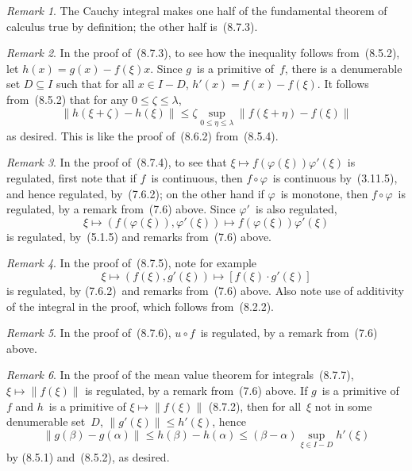 \documentclass[letterpaper,12pt]{article}
\newcommand{\after}{\circ}
\newcommand{\norm}[1]{\lVert{#1}\rVert}
\newcommand{\cbprod}[2]{[{#1}\cdot{#2}]}
\theoremstyle{plain}
\theoremstyle{definition}
\theoremstyle{remark}
\newtheorem*{rmk}{Remark}
\begin{document}
\begin{rmk}
The Cauchy integral makes one half of the fundamental theorem of calculus true by definition; the other half is~(8.7.3).
\end{rmk}

\begin{rmk}
In the proof of~(8.7.3), to see how the inequality follows from~(8.5.2), let \(h(x)=g(x)-f(\xi)x\). Since \(g\)~is a primitive of~\(f\), there is a denumerable set \(D\subseteq I\) such that for all \(x\in I-D\), \(h'(x)=f(x)-f(\xi)\). It follows from~(8.5.2) that for any \(0\le\zeta\le\lambda\),
\[\norm{h(\xi+\zeta)-h(\xi)}\le\zeta\sup_{0\le\eta\le\lambda}\norm{f(\xi+\eta)-f(\xi)}\]
as desired. This is like the proof of~(8.6.2) from~(8.5.4).
\end{rmk}

\begin{rmk}
In the proof of~(8.7.4), to see that \(\xi\mapsto f(\varphi(\xi))\varphi'(\xi)\) is regulated, first note that if \(f\)~is continuous, then \(f\after\varphi\)~is continuous by~(3.11.5), and hence regulated, by~(7.6.2); on the other hand if \(\varphi\)~is monotone, then \(f\after\varphi\)~is regulated, by a remark from~(7.6) above. Since \(\varphi'\)~is also regulated,
\[\xi\mapsto(f(\varphi(\xi)),\varphi'(\xi))\mapsto f(\varphi(\xi))\varphi'(\xi)\]
is regulated, by~(5.1.5) and remarks from~(7.6) above.
\end{rmk}

\begin{rmk}
In the proof of~(8.7.5), note for example
\[\xi\mapsto(f(\xi),g'(\xi))\mapsto\cbprod{f(\xi)}{g'(\xi)}\]
is regulated, by (7.6.2)~and remarks from~(7.6) above. Also note use of additivity of the integral in the proof, which follows from~(8.2.2).
\end{rmk}

\begin{rmk}
In the proof of~(8.7.6), \(u\after f\)~is regulated, by a remark from~(7.6) above.
\end{rmk}

\begin{rmk}
In the proof of the mean value theorem for integrals~(8.7.7), \(\xi\mapsto\norm{f(\xi)}\) is regulated, by a remark from~(7.6) above. If \(g\)~is a primitive of~\(f\) and \(h\)~is a primitive of \(\xi\mapsto\norm{f(\xi)}\) (8.7.2), then for all~\(\xi\) not in some denumerable set~\(D\), \(\norm{g'(\xi)}\le h'(\xi)\), hence
\[\norm{g(\beta)-g(\alpha)}\le h(\beta)-h(\alpha)\le(\beta-\alpha)\sup_{\xi\in I-D} h'(\xi)\]
by (8.5.1) and~(8.5.2), as desired.
\end{rmk}
\end{document}
